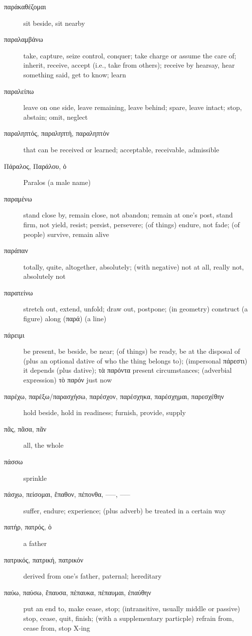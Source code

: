 \documentclass[12pt,letterpaper]{article}
\begin{document}
\begin{description}
    \item[\textgreek{παράκαθέζομαι}] sit beside, sit nearby
    \item[\textgreek{παραλαμβάνω}] take, capture, seize control, conquer; take charge or assume the care of; inherit, receive, accept (i.e., take from others); receive by hearsay, hear something said, get to know; learn
    \item[\textgreek{παραλείπω}] leave on one side, leave remaining, leave behind; spare, leave intact; stop, abstain; omit, neglect
    \item[\textgreek{παραληπτός, παραληπτή, παραληπτόν}] that can be received or learned; acceptable, receivable, admissible
    \item[\textgreek{Πάραλος, Παράλου, ὁ}] Paralos (a male name)
    \item[\textgreek{παραμένω}] stand close by, remain close, not abandon; remain at one's post, stand firm, not yield, resist; persist, persevere; (of things) endure, not fade; (of people) survive, remain alive
    \item[\textgreek{παράπαν}] totally, quite, altogether, absolutely; (with negative) not at all, really not, absolutely not
    \item[\textgreek{παρατείνω}] stretch out, extend, unfold; draw out, postpone; (in geometry) construct (a figure) along (\textgreek{παρά}) (a line)
    \item[\textgreek{πάρειμι}] \marginnote{*}be present, be beside, be near; (of things) be ready, be at the disposal of (plus an optional dative of who the thing belongs to); (impersonal πάρεστι) it depends (plus dative); τὰ παρόντα present circumstances; (adverbial expression) τὸ παρόν just now
    \item[\textgreek{παρέχω, παρέξω/παρασχήσω, παρέσχον, παρέσχηκα, παρέσχημαι, παρεσχέθην}] \marginnote{*}hold beside, hold in readiness; furnish, provide, supply
    \item[\textgreek{πᾶς, πᾶσα, πᾶν}] \marginnote{*}all, the whole
    \item[\textgreek{πάσσω}] sprinkle
    \item[\textgreek{πάσχω, πείσομαι, ἔπαθον, πέπονθα, –––, –––}] \marginnote{*}suffer, endure; experience; (plus adverb) be treated in a certain way
    \item[\textgreek{πατήρ, πατρός, ὁ}] \marginnote{*}a father
    \item[\textgreek{πατρικός, πατρική, πατρικόν}] derived from one's father, paternal; hereditary
    \item[\textgreek{παύω, παύσω, ἔπαυσα, πέπαυκα, πέπαυμαι, ἐπαύθην}] \marginnote{*}put an end to, make cease, stop; (intransitive, usually middle or passive) stop, cease, quit, finish; (with a supplementary particple) refrain from, cease from, stop X-ing

\end{description}
\end{document}
